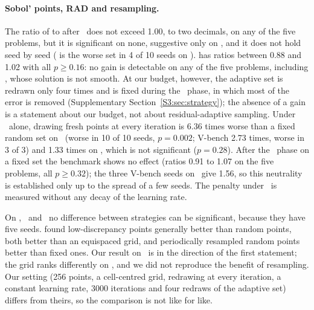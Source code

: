 \paragraph{Sobol' points, RAD and resampling.}
The ratio of  to  after \AdamLBFGS\ does not exceed 1.00, to two
decimals, on any of the five problems, but it is significant on none, suggestive only on
\PLtwo, and it does not hold seed by seed ( is the worse set in 4 of 10 seeds on
\PH).  has ratios between 0.88 and 1.02 with all $p\ge0.16$: no gain is
detectable on any of the five problems, including \PLthree, whose solution is not smooth.
At our budget, however, the adaptive set is redrawn only four times and is fixed during the
\LBFGS\ phase, in which most of the error is removed (Supplementary
Section~\ref{S3:sec:strategy}); the absence of a gain is a statement about our budget, not
about residual-adaptive sampling.
Under \Adam\ alone, drawing fresh points at every iteration is 6.36 times worse than a fixed
random set on \PLtwo\ (worse in 10 of 10 seeds, $p=0.002$; \textsf{V-bench} 2.73 times, worse
in 3 of 3) and 1.33 times on \PH, which is not significant ($p=0.28$). After the \LBFGS\ phase
on a fixed set the benchmark shows no effect (ratios 0.91 to 1.07 on the five problems, all
$p\ge0.32$); the three \textsf{V-bench} seeds on \PLtwo\ give 1.56, so this neutrality is
established only up to the spread of a few seeds. The penalty under \Adam\ is measured without
any decay of the learning rate.

On \PWone, \PWtwo\ and \PLthree\ no difference between strategies can be significant,
because they have five seeds.
\citet{wu2023} found low-discrepancy points generally better than random points, both
better than an equispaced grid, and periodically resampled random points better than
fixed ones. Our  result on \PLtwo\ is in the direction of the first
statement; the grid ranks differently on \PLtwo, and we did not reproduce the benefit of
resampling. Our setting (256 points, a cell-centred grid, redrawing at every iteration, a
constant learning rate, 3000 iterations and four redraws of the adaptive set) differs from
theirs, so the comparison is not like for like.

